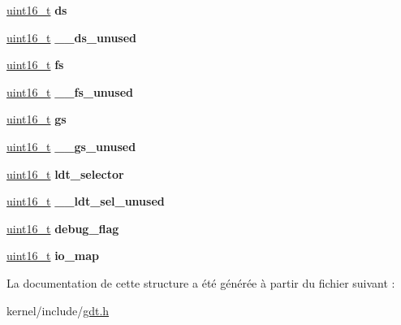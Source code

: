 \begin{DoxyCompactItemize}
\item 
\hypertarget{structtss_a61d9e6067b9aa36d03e0ddc8c0aa61ac}{\hyperlink{types_8h_adf4d876453337156dde61095e1f20223}{uint16\-\_\-t} {\bfseries ds}}\label{structtss_a61d9e6067b9aa36d03e0ddc8c0aa61ac}

\item 
\hypertarget{structtss_a004da4e1f6237ea260d9fd7b30b10d86}{\hyperlink{types_8h_adf4d876453337156dde61095e1f20223}{uint16\-\_\-t} {\bfseries \-\_\-\-\_\-ds\-\_\-unused}}\label{structtss_a004da4e1f6237ea260d9fd7b30b10d86}

\item 
\hypertarget{structtss_ac1551845bffc4e9c4f79fddb78523eb0}{\hyperlink{types_8h_adf4d876453337156dde61095e1f20223}{uint16\-\_\-t} {\bfseries fs}}\label{structtss_ac1551845bffc4e9c4f79fddb78523eb0}

\item 
\hypertarget{structtss_a6461203b734917913053143eda5e7595}{\hyperlink{types_8h_adf4d876453337156dde61095e1f20223}{uint16\-\_\-t} {\bfseries \-\_\-\-\_\-fs\-\_\-unused}}\label{structtss_a6461203b734917913053143eda5e7595}

\item 
\hypertarget{structtss_ac2889cd76d537bf35e00b0a498733209}{\hyperlink{types_8h_adf4d876453337156dde61095e1f20223}{uint16\-\_\-t} {\bfseries gs}}\label{structtss_ac2889cd76d537bf35e00b0a498733209}

\item 
\hypertarget{structtss_a0164550a474dc0918057cea651116728}{\hyperlink{types_8h_adf4d876453337156dde61095e1f20223}{uint16\-\_\-t} {\bfseries \-\_\-\-\_\-gs\-\_\-unused}}\label{structtss_a0164550a474dc0918057cea651116728}

\item 
\hypertarget{structtss_a934b41d2a63e759757d3afa0fab227c1}{\hyperlink{types_8h_adf4d876453337156dde61095e1f20223}{uint16\-\_\-t} {\bfseries ldt\-\_\-selector}}\label{structtss_a934b41d2a63e759757d3afa0fab227c1}

\item 
\hypertarget{structtss_a927509e57cfd273e377cec7368aedb50}{\hyperlink{types_8h_adf4d876453337156dde61095e1f20223}{uint16\-\_\-t} {\bfseries \-\_\-\-\_\-ldt\-\_\-sel\-\_\-unused}}\label{structtss_a927509e57cfd273e377cec7368aedb50}

\item 
\hypertarget{structtss_acfac9fc24de46f84d90c08d1b9b439e3}{\hyperlink{types_8h_adf4d876453337156dde61095e1f20223}{uint16\-\_\-t} {\bfseries debug\-\_\-flag}}\label{structtss_acfac9fc24de46f84d90c08d1b9b439e3}

\item 
\hypertarget{structtss_a25381c4288df77c8ab283299a1a288e8}{\hyperlink{types_8h_adf4d876453337156dde61095e1f20223}{uint16\-\_\-t} {\bfseries io\-\_\-map}}\label{structtss_a25381c4288df77c8ab283299a1a288e8}

\end{DoxyCompactItemize}


La documentation de cette structure a été générée à partir du fichier suivant \-:\begin{DoxyCompactItemize}
\item 
kernel/include/\hyperlink{gdt_8h}{gdt.\-h}\end{DoxyCompactItemize}
